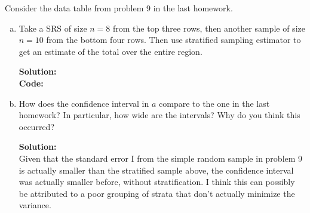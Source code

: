 \documentclass[12pt]{article}
\makeatletter
\theoremstyle{homework}
\newenvironment{exercise}[1]
{\def\@currentlabel{#1}\exercisecore}
{\endexercisecore}
\newcommand{\localhead}[1]{\par\smallskip\noindent\textbf{#1}\nobreak\\}%
\newcommand\solution{\localhead{Solution:}}
\makeatother
\begin{document}
\begin{exercise}{1} Consider the data table from problem 9 in the last homework.
    \begin{enumerate}[a.]
        \item Take a SRS of size $n = 8$ from the top three rows, then another sample
        of size $n = 10$ from the bottom four rows. Then use stratified sampling estimator to get an 
        estimate of the total over the entire region. \\
        \solution
        \textbf{Code:}
        \begin{center}
            
        \end{center}

        \item How does the confidence interval in $a$ compare to the one in the last homework?
        In particular, how wide are the intervals? Why do you think this occurred?\\
        \solution Given that the standard error I from the simple random sample in problem 9 is actually
        smaller than the stratified sample above, the confidence interval was actually smaller before, without stratification. 
        I think this can possibly be attributed to a poor grouping of strata that don't actually minimize the variance. 
    \end{enumerate}
\end{exercise}
\vspace{1in}
\end{document}
